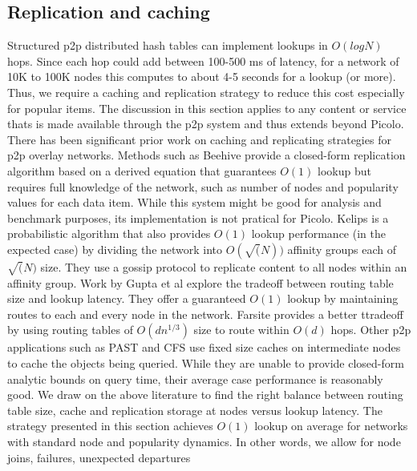 \subsection{Replication and caching}
\label{net:replication}
Structured p2p distributed hash tables can implement lookups in \( O(log N)\) hops. Since each hop could add between 100-500
ms of latency, for a network of 10K to 100K nodes this computes to about 4-5 seconds for a lookup (or more). Thus, we
require a caching and replication strategy to reduce this cost especially for popular items. The discussion in this
section applies to any content or service thats is made available through the p2p system and thus extends beyond \textsf{Picolo}.
\newline\newline
There has been significant prior work on caching and replicating strategies for p2p overlay networks. Methods such
as Beehive \cite{beehive} provide a closed-form replication algorithm based on a derived equation that guarantees
\(O(1)\) lookup but requires full knowledge of the network, such as number of nodes and popularity values for each data
item. While this system might be good for analysis and benchmark purposes, its implementation is not pratical for
\textsf{Picolo}. Kelips \cite{kelips} is a probabilistic algorithm that also provides \(O(1)\) lookup performance (in the
expected case) by dividing the network into \(O(\sqrt(N))\) affinity groups each of \(\sqrt(N)\) size. They use a gossip protocol to replicate content to all nodes within an affinity group. Work by Gupta et al \cite{one_hop_lookup}
explore the tradeoff between routing table size and lookup latency. They offer a guaranteed \(O(1)\) lookup by
maintaining routes to each and every node in the network. Farsite \cite{farsite} provides a better ttradeoff by using
routing tables of \(O(dn^{1/3})\) size to route within \(O(d)\) hops. Other p2p applications such as PAST \cite{past} and CFS \cite{cfs} use fixed size caches on intermediate nodes to
cache the objects being queried. While they are unable to provide closed-form analytic bounds on query time, their
average case performance is reasonably good.
\newline\newline
We draw on the above literature to find the right balance between routing table size, cache and replication storage at
nodes versus lookup latency. The strategy presented in this section achieves \(O(1)\) lookup on average for networks
with standard node and popularity dynamics. In other words, we allow for node joins, failures, unexpected departures
